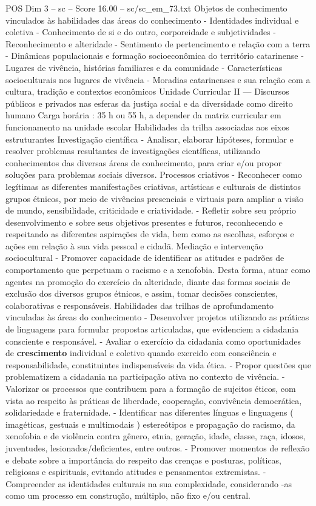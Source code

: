 \begin{textsample}{POS Dim 3 – sc – Score 16.00 – sc/sc\_em\_73.txt}
Objetos de conhecimento vinculados às habilidades das áreas do conhecimento - Identidades individual e coletiva - Conhecimento de si e do outro, corporeidade e subjetividades - Reconhecimento e alteridade - Sentimento de pertencimento e relação com a terra - Dinâmicas populacionais e formação socioeconômica do território catarinense - Lugares de vivência, histórias familiares e da comunidade - Características socioculturais nos lugares de vivência - Moradias catarinenses e sua relação com a cultura, tradição e contextos econômicos Unidade Curricular II — Discursos públicos e privados nas esferas da justiça social e da diversidade como direito humano Carga horária : 35 h ou 55 h, a depender da matriz curricular em funcionamento na unidade escolar Habilidades da trilha associadas aos eixos estruturantes Investigação científica - Analisar, elaborar hipóteses, formular e resolver problemas resultantes de investigações científicas, utilizando conhecimentos das diversas áreas de conhecimento, para criar e/ou propor soluções para problemas sociais diversos.
Processos criativos - Reconhecer como legítimas as diferentes manifestações criativas, artísticas e culturais de distintos grupos étnicos, por meio de vivências presenciais e virtuais para ampliar a visão de mundo, sensibilidade, criticidade e criatividade. - Refletir sobre seu próprio desenvolvimento e sobre seus objetivos presentes e futuros, reconhecendo e respeitando as diferentes aspirações de vida, bem como as escolhas, esforços e ações em relação à sua vida pessoal e cidadã.
Mediação e intervenção sociocultural - Promover capacidade de identificar as atitudes e padrões de comportamento que perpetuam o racismo e a xenofobia.
Desta forma, atuar como agentes na promoção do exercício da alteridade, diante das formas sociais de exclusão dos diversos grupos étnicos, e assim, tomar decisões conscientes, colaborativas e responsáveis.
Habilidades das trilhas de aprofundamento vinculadas às áreas do conhecimento - Desenvolver projetos utilizando as práticas de linguagens para formular propostas articuladas, que evidenciem a cidadania consciente e responsável. - Avaliar o exercício da cidadania como oportunidades de \textbf{crescimento} individual e coletivo quando exercido com consciência e responsabilidade, constituintes indispensáveis da vida ética. - Propor questões que problematizem a cidadania na participação ativa no contexto de vivência. - Valorizar os processos que contribuem para a formação de sujeitos éticos, com vista ao respeito às práticas de liberdade, cooperação, convivência democrática, solidariedade e fraternidade. - Identificar nas diferentes línguas e linguagens ( imagéticas, gestuais e multimodais ) estereótipos e propagação do racismo, da xenofobia e de violência contra gênero, etnia, geração, idade, classe, raça, idosos, juventudes, lesionados/deficientes, entre outros. - Promover momentos de reflexão e debate sobre a importância do respeito das crenças e posturas, políticas, religiosas e espirituais, evitando atitudes e pensamentos extremistas. - Compreender as identidades culturais na sua complexidade, considerando -as como um processo em construção, múltiplo, não fixo e/ou central.

\end{textsample}

